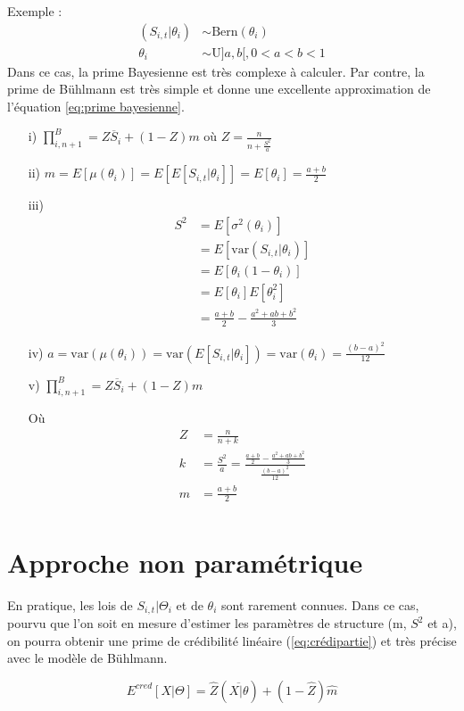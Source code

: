 Exemple : 
\begin{align*}
(S_{i,t}|\theta_i) & \sim \text{Bern}(\theta_i) \\
\theta_i & \sim \text{U} ]a,b[, 0 < a<b<1
\end{align*}
Dans ce cas, la prime Bayesienne est très complexe à calculer.
Par contre, la prime de Bühlmann est très simple et donne une excellente approximation de l'équation \ref{eq:prime bayesienne}.
\begin{itemize}
\item[i)] $\prod_{i,n+1}^{B} = Z \overline{S}_i + (1 -Z)m$ où $Z = \frac{n}{n + \frac{S^2}{a}}$
\item[ii)] $m = E[\mu(\theta_i)] = E[E[S_{i,t}|\theta_i]] = E[\theta_i] = \frac{a+b}{2}$
\item[iii)] \begin{align*}
S^2 &= E[\sigma^2(\theta_i)] \\
&= E[\text{var}(S_{i,t}|\theta_i)] \\
&= E[\theta_i(1 - \theta_i)] \\
&= E[\theta_i]E[\theta_{i}^{2}] \\
&= \frac{a+b}{2} - \frac{a^2 + ab + b^2}{3}
\end{align*}
\item[iv)] $a =\text{var}(\mu(\theta_i)) = \text{var}(E[S_{i,t}|\theta_i]) = \text{var}(\theta_i) = \frac{(b - a)^2}{12}$
\item[v)] $ \prod_{i,n+1}^{B} = Z \overline{S}_i + (1 -Z)m$

Où 
\begin{align*}
Z &=  \frac{n}{n+k} \\
k &= \frac{S^2}{a} = \frac{\frac{a+b}{2} - \frac{a^2 + ab + b^2}{3}}{\frac{(b - a)^2}{12}} \\
m &= \frac{a + b}{2}\\
\end{align*}
\end{itemize}

\section{Approche non paramétrique}
En pratique, les lois de $S_{i,t}|\Theta_i$ et de $\theta_i$ sont rarement connues. Dans ce cas, pourvu que l'on soit en mesure d'estimer les paramètres de structure (m, $S^2$ et a), on pourra obtenir une prime de crédibilité linéaire (\ref{eq:crédipartie}) et très précise avec le modèle de Bühlmann.

\begin{equation}
E^{cred}[X|\Theta] = \widehat{Z} (\overline{X|\theta}) + (1 - \widehat{Z}) \widehat{m}
\end{equation}
